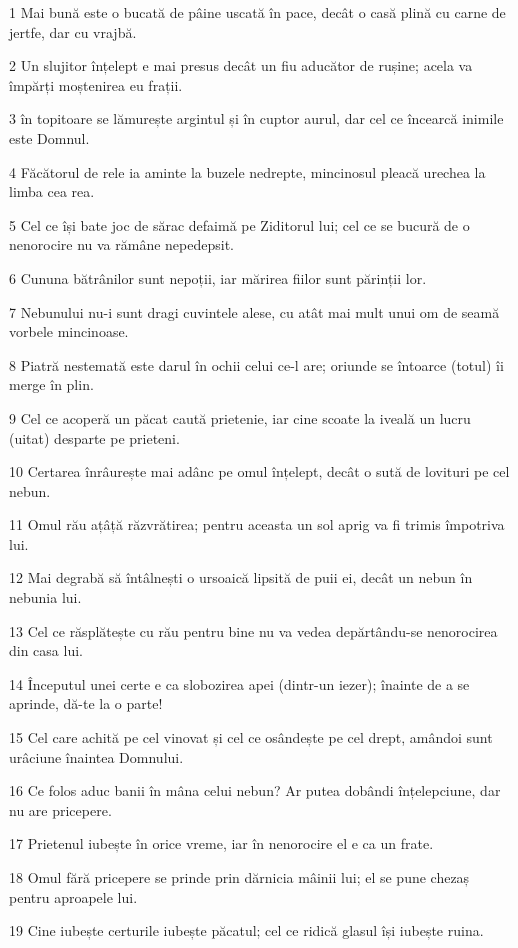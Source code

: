 \par 1 Mai bună este o bucată de pâine uscată în pace, decât o casă plină cu carne de jertfe, dar cu vrajbă.
\par 2 Un slujitor înțelept e mai presus decât un fiu aducător de rușine; acela va împărți moștenirea eu frații.
\par 3 în topitoare se lămurește argintul și în cuptor aurul, dar cel ce încearcă inimile este Domnul.
\par 4 Făcătorul de rele ia aminte la buzele nedrepte, mincinosul pleacă urechea la limba cea rea.
\par 5 Cel ce își bate joc de sărac defaimă pe Ziditorul lui; cel ce se bucură de o nenorocire nu va rămâne nepedepsit.
\par 6 Cununa bătrânilor sunt nepoții, iar mărirea fiilor sunt părinții lor.
\par 7 Nebunului nu-i sunt dragi cuvintele alese, cu atât mai mult unui om de seamă vorbele mincinoase.
\par 8 Piatră nestemată este darul în ochii celui ce-l are; oriunde se întoarce (totul) îi merge în plin.
\par 9 Cel ce acoperă un păcat caută prietenie, iar cine scoate la iveală un lucru (uitat) desparte pe prieteni.
\par 10 Certarea înrâurește mai adânc pe omul înțelept, decât o sută de lovituri pe cel nebun.
\par 11 Omul rău ațâță răzvrătirea; pentru aceasta un sol aprig va fi trimis împotriva lui.
\par 12 Mai degrabă să întâlnești o ursoaică lipsită de puii ei, decât un nebun în nebunia lui.
\par 13 Cel ce răsplătește cu rău pentru bine nu va vedea depărtându-se nenorocirea din casa lui.
\par 14 Începutul unei certe e ca slobozirea apei (dintr-un iezer); înainte de a se aprinde, dă-te la o parte!
\par 15 Cel care achită pe cel vinovat și cel ce osândește pe cel drept, amândoi sunt urâciune înaintea Domnului.
\par 16 Ce folos aduc banii în mâna celui nebun? Ar putea dobândi înțelepciune, dar nu are pricepere.
\par 17 Prietenul iubește în orice vreme, iar în nenorocire el e ca un frate.
\par 18 Omul fără pricepere se prinde prin dărnicia mâinii lui; el se pune chezaș pentru aproapele lui.
\par 19 Cine iubește certurile iubește păcatul; cel ce ridică glasul își iubește ruina.
